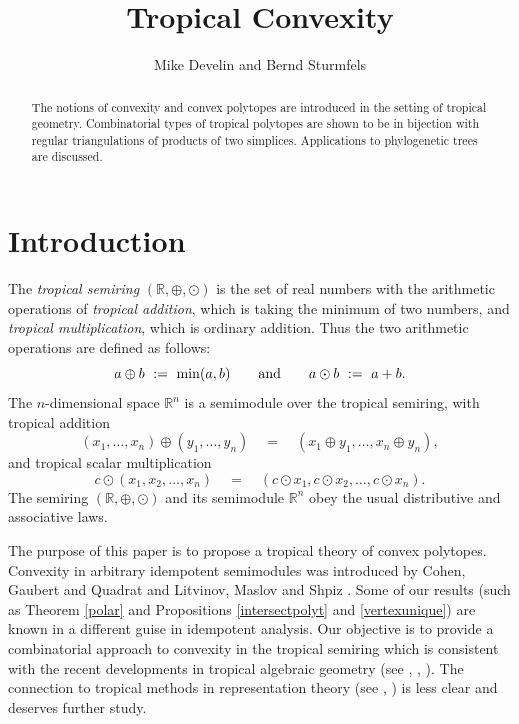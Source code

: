 \documentclass[11pt]{amsart}
\newcommand{\RR}{\mathbb{R}}
\begin{document}
\title{Tropical Convexity}

\author[Develin and Sturmfels]{Mike Develin and Bernd Sturmfels}

\address{Mike Develin, American Institute of Mathematics, 360 Portage Ave., Palo Alto, CA 94306-2244, USA}
\address{Bernd Sturmfels, Department of Mathematics, University
of California, Berkeley, CA 94720, USA}

\begin{abstract}
The notions of convexity and convex polytopes are 
introduced in the setting of tropical geometry.
Combinatorial types of tropical polytopes
are shown to be in bijection with regular
triangulations of products of two simplices.
Applications to phylogenetic trees are discussed.
\end{abstract}

\maketitle

\section{Introduction}

The \emph{tropical semiring} $(\RR, \oplus, \odot)$ is the set
of real numbers with the arithmetic operations of
\emph{tropical addition}, which is taking the minimum of two numbers,
and \emph{tropical multiplication}, which is ordinary addition.
Thus the two arithmetic operations are defined as follows:
$$ a \oplus b \,\, := \,\, {\rm min} (a,b) \qquad
\hbox{and} \qquad a \odot b \,\, := \,\, a + b . $$
The $n$-dimensional space $\RR^n$  is a semimodule over the
tropical semiring, with tropical addition
$$  (x_1,\ldots,x_n) \oplus (y_1,\ldots,y_n) \quad = \quad
(x_1 \oplus y_1, \ldots, x_n \oplus y_n) , $$
and tropical scalar multiplication
$$ c \odot (x_1,x_2,\ldots,x_n) \quad = \quad (c \odot x_1,
c \odot x_2, \ldots, c \odot x_n) . $$
The semiring $(\RR, \oplus, \odot)$ and its semimodule
$\RR^n$ obey the usual distributive and associative laws.

The purpose of this paper is to propose a tropical theory
of convex polytopes.
Convexity in arbitrary idempotent semimodules was introduced
by Cohen, Gaubert  and Quadrat \cite{CGQ}
and  Litvinov, Maslov and Shpiz \cite{LMS}. 
Some of our results (such as Theorem \ref{polar}
and Propositions \ref{intersectpolyt} and
\ref{vertexunique}) are known in a different
guise in idempotent analysis.
Our objective is to  provide
a combinatorial approach to convexity 
in the tropical semiring which is
consistent with the recent developments in
tropical algebraic geometry (see \cite{Mi}, \cite{RGST}, \cite{SS}).
The connection to tropical methods in
representation theory  (see \cite{K},  \cite{NY}) is
less clear and deserves further study.
\end{document}

